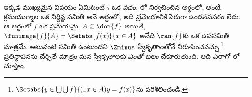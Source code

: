 \documentclass[../../../include/open-logic-section]{subfiles}
\begin{document}
ఇక్కడ ముఖ్యమైన విషయం ఏమిటంటే $\tau$ ఒక \emph{పదం}.
లో నిర్వచించిన అర్థంలో,
అంటే, క్రమయుగ్మాల ఒక నిర్దిష్ట సమితి అనే అర్థంలో,
అది \emph{ప్రమేయానికి} పేరుగా ఉండనవసరం లేదు.
ఆ అర్థంలో $f$ ఒక ప్రమేయమై, $A \subseteq \dom{f}$ అయితే,
$\funimage{f}{A} = \Setabs{f(x)}{x \in
A}$ అనేది $\ran{f}$కు ఒక ఉపసమితి మాత్రమే.
అటువంటి సమితి ఉంటుందని $\Zminus$ స్వీకృతాలతోనే నిరూపించవచ్చు.\footnote{$\Setabs{y \in \bigcup \bigcup f}{(\exists x \in A)y =
f(x)}$ను పరిశీలించండి.}
ప్రతిస్థాపనను చేర్చితే మాత్రం మన స్వీకృతాలకు
\emph{ఎంతో బలం} చేకూరుతుంది. అది ఎలాగో
లో చూస్తాం.
\end{document}
